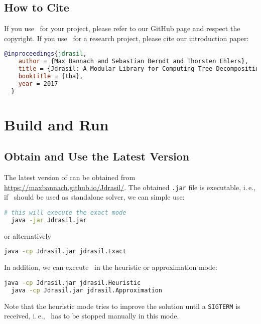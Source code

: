 \documentclass[a4paper, ukenglish, twoside, openright]{jdrasilmanual}
\begin{document}
\section{How to Cite \Jdrasil}
If you use \Jdrasil\ for your project, please refer to our GitHub
page and respect the copyright. If you use \Jdrasil\ for a research
project, please cite our introduction paper:
\begin{lstlisting}[language=BibTeX]
  @inproceedings{jdrasil,
    author = {Max Bannach and Sebastian Berndt and Thorsten Ehlers},
    title = {Jdrasil: A Modular Library for Computing Tree Decompositions},
    booktitle = {tba},
    year = 2017
  }
\end{lstlisting}
\chapter{Build and Run \Jdrasil}
\section{Obtain and Use the Latest Version}
The latest version of \Jdrasil{} can be obtained from
\url{https://maxbannach.github.io/Jdrasil/}. The obtained
\texttt{.jar} file is executable, i.\,e., if \Jdrasil\ should be used
as standalone solver, we can simple use:
\begin{lstlisting}[language=bash]
  # this will execute the exact mode
  java -jar Jdrasil.jar
\end{lstlisting}
or alternatively
\begin{lstlisting}[language=bash]
  java -cp Jdrasil.jar jdrasil.Exact
\end{lstlisting}
In addition, we can execute \Jdrasil\ in the heuristic or
approximation mode:
\begin{lstlisting}[language=bash]
  java -cp Jdrasil.jar jdrasil.Heuristic
  java -cp Jdrasil.jar jdrasil.Approximation
\end{lstlisting}
Note that the heuristic mode tries to improve the solution
until a \texttt{SIGTERM} is received, i.\,e., \Jdrasil\ has to be stopped
manually in this mode. 
\end{document}
